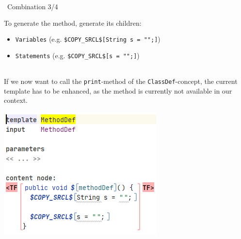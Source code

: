 	\begin{frame}{\workshoptemplate\ Combination 3/4}
	\begin{minipage}{0.52\textwidth}
		To generate the method, generate its children: \\
		\begin{itemize}
			\item \texttt{Variables} (e.g. \texttt{\$COPY\_SRCL\$[String s = "";]})
			\item \texttt{Statements} (e.g. \texttt{\$COPY\_SRCL\$[s = "";]})
		\end{itemize}
	
		\textcolor{white}{m}\\
		
		If we now want to call the \texttt{print}-method of the \texttt{ClassDef}-concept, the current template has to be enhanced, as the method is currently not available in our context.
	\end{minipage}
	\begin{minipage}{0.4\textwidth}
		\includegraphics[height=0.8\textheight]{illustrations/methodDefGen.png}
	\end{minipage}
	\end{frame}

